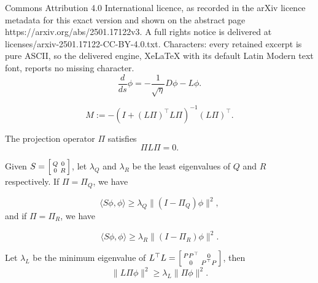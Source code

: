 \documentclass[10pt,a4paper]{amsart}
\begin{document}
Commons Attribution 4.0 International licence, as recorded in the arXiv licence metadata for this exact version and shown on the abstract page https://arxiv.org/abs/2501.17122v3. A full rights notice is delivered at licenses/arxiv-2501.17122-CC-BY-4.0.txt. Characters: every retained excerpt is pure ASCII, so the delivered engine, XeLaTeX with its default Latin Modern text font, reports no missing character.
\begin{equation}\label{eqn:time_s}
    \frac{d}{d s} \phi = -\frac{1}{\sqrt{\eta}}D \phi- L\phi.
\end{equation}

\begin{equation}\label{operator:M}
    M :=- ( I+(L\Pi)^{\top} L\Pi)^{-1}(L\Pi)^{\top}.
\end{equation}

\begin{assumption}\label{assump:ag} The projection operator $\Pi$ satisfies
   \begin{equation}
    \Pi L \Pi = 0.
\end{equation} 
\end{assumption}

\begin{assumption}\label{assump:D}
 Given $S = \Bigl[\begin{smallmatrix}
            Q & 0\\
            0 &  R
        \end{smallmatrix}\Bigr]$, let $\lambda_Q$ and $\lambda_R$ be the least eigenvalues of $Q$ and $R$ respectively.  If $\Pi=\Pi_Q$, we have
        
        \begin{equation}
            \langle S\phi, \phi\rangle\geq \lambda_Q \|(I-\Pi_Q)\phi\|^2,
        \end{equation}
 and if $\Pi=\Pi_R$, we have
        
        \begin{equation}
           \langle S\phi, \phi\rangle\geq \lambda_R \|(I-\Pi_R)\phi\|^2.
        \end{equation}
\end{assumption}

\begin{assumption}\label{assump:L}
Let $\lambda_L$ be the minimum eigenvalue of $L^{\top}L = \Bigl[ \begin{smallmatrix}
            PP^\top & 0\\
            0 & P^\top P
        \end{smallmatrix}\Bigr]$, then
        \begin{equation}
            \|L\Pi\phi\|^2\geq \lambda_L \|\Pi\phi\|^2.
        \end{equation}
\end{assumption}
\end{document}
